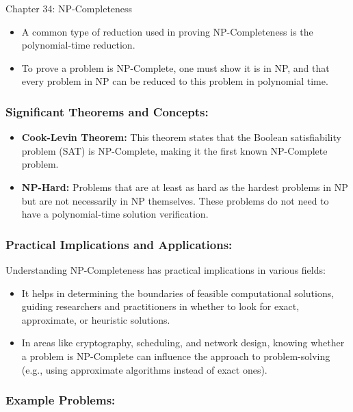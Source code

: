 \begin{notes}{Chapter 34: NP-Completeness}
    \begin{itemize}
        \item A common type of reduction used in proving NP-Completeness is the polynomial-time reduction.
        \item To prove a problem is NP-Complete, one must show it is in NP, and that every problem in NP can be reduced to this problem in polynomial time.
    \end{itemize}
    
    \subsubsection*{Significant Theorems and Concepts:}
    
    \begin{itemize}
        \item \textbf{Cook-Levin Theorem:} This theorem states that the Boolean satisfiability problem (SAT) is NP-Complete, making it the first known NP-Complete problem.
        \item \textbf{NP-Hard:} Problems that are at least as hard as the hardest problems in NP but are not necessarily in NP themselves. These problems do not need to have a polynomial-time solution verification.
    \end{itemize}
    
    \subsubsection*{Practical Implications and Applications:}
    
    Understanding NP-Completeness has practical implications in various fields:
    
    \begin{itemize}
        \item It helps in determining the boundaries of feasible computational solutions, guiding researchers and practitioners in whether to look for exact, approximate, or heuristic solutions.
        \item In areas like cryptography, scheduling, and network design, knowing whether a problem is NP-Complete can influence the approach to problem-solving (e.g., using approximate algorithms instead of exact ones).
    \end{itemize}
    
    \subsubsection*{Example Problems:}
    

\end{notes}
